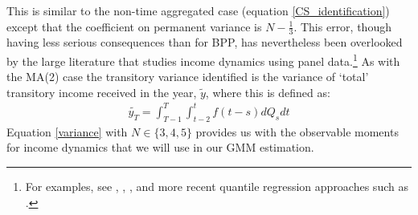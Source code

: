 \documentclass[titlepage]{\econtex}\newcommand{\texname}{ConsumptionHeterogeneity}
\begin{document}
This is similar to the non-time aggregated case (equation \ref{CS_identification}) except that the coefficient on permanent variance is $N-\frac{1}{3}$. This error, though having less serious consequences than for BPP, has nevertheless been overlooked by the large literature that studies income dynamics using panel data.\footnote{For examples, see \cite{moffitt_trends_2012}, \cite{meghir_income_2004}, \cite{nielsen_impact_2004}, \cite{heathcote_unequal_2010} and more recent quantile regression approaches such as \cite{arellano_earnings_2017}.} As with the MA(2) case the transitory variance identified is the variance of `total' transitory income received in the year, $\tilde{y}$, where this is defined as:
\begin{align}
\tilde{y_T} = \int_{T-1}^{T}\int_{t-2}^{t} f(t-s)dQ_s dt \label{tot_income}
\end{align}
Equation \ref{variance} with $N \in \{3,4,5\}$ provides us with the observable moments for income dynamics that we will use in our GMM estimation.
\end{document}
